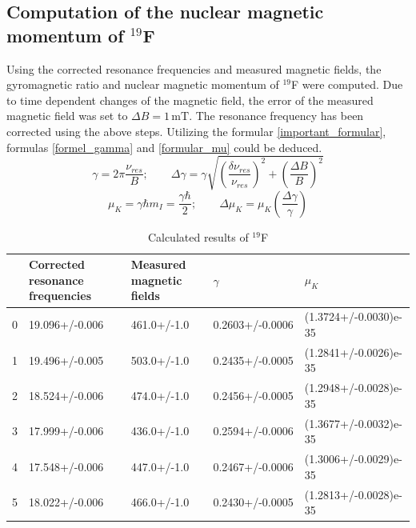 \subsection{Computation of the nuclear magnetic momentum of $^{19}$F}
Using the corrected resonance frequencies and measured magnetic fields, the gyromagnetic ratio and nuclear magnetic momentum of $^{19}$F were computed. Due to time dependent changes of the magnetic field, the error of the measured magnetic field was set to $\Delta B = 1\,\text{mT}$. The resonance frequency has been corrected using the above steps. Utilizing the formular \ref{important_formular}, formulas \ref{formel_gamma} and \ref{formular_mu} could be deduced.
\begin{equation}
	\label{formel_gamma}
	\gamma = 2 \pi \frac{\nu_{res}}{B};\qquad \Delta\gamma = \gamma \sqrt{\left(\frac{\delta\nu_{res}}{\nu_{res}}\right)^2 + \left(\frac{\Delta B}{B}\right)^2}
\end{equation}
\begin{equation}
\label{formular_mu}
	\mu_K = \gamma\hbar m_I = \frac{\gamma\hbar}{2}; \qquad \Delta \mu_K = \mu_K \left(\frac{\Delta \gamma}{\gamma}\right)
\end{equation}
\begin{table}[h]
	\caption{Calculated results of $^{19}$F}
	\label{teflon}
	\begin{tabular}{lllll}
		\toprule
		{} & Corrected resonance frequencies & Measured magnetic fields &           $\gamma$ &                $\mu_K$ \\
		\midrule
		0 &                  19.096+/-0.006 &              461.0+/-1.0 &  0.2603+/-0.0006 &  (1.3724+/-0.0030)e-35 \\
		1 &                  19.496+/-0.005 &              503.0+/-1.0 &  0.2435+/-0.0005 &  (1.2841+/-0.0026)e-35 \\
		2 &                  18.524+/-0.006 &              474.0+/-1.0 &  0.2456+/-0.0005 &  (1.2948+/-0.0028)e-35 \\
		3 &                  17.999+/-0.006 &              436.0+/-1.0 &  0.2594+/-0.0006 &  (1.3677+/-0.0032)e-35 \\
		4 &                  17.548+/-0.006 &              447.0+/-1.0 &  0.2467+/-0.0006 &  (1.3006+/-0.0029)e-35 \\
		5 &                  18.022+/-0.006 &              466.0+/-1.0 &  0.2430+/-0.0005 &  (1.2813+/-0.0028)e-35 \\
		\bottomrule
	\end{tabular}

\end{table}

